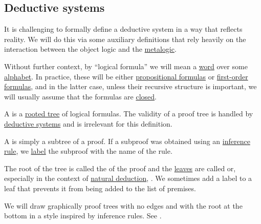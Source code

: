 \subsection{Deductive systems}\label{subsec:deductive_systems}

It is challenging to formally define a deductive system in a way that reflects reality. We will do this via some auxiliary definitions that rely heavily on the interaction between the object logic and the \hyperref[con:metalogic]{metalogic}.

Without further context, by \enquote{logical formula} we will mean a \hyperref[def:formal_language/word]{word} over some \hyperref[def:formal_language]{alphabet}. In practice, these will be either \hyperref[def:propositional_grammar_schema/formula]{propositional formulas} or \hyperref[def:first_order_syntax/formula]{first-order formulas}, and in the latter case, unless their recursive structure is important, we will usually assume that the formulas are \hyperref[def:first_order_syntax/closed_formula]{closed}.

\begin{definition}\label{def:proof_tree}\mimprovised
  A  is a \hyperref[def:rooted_tree]{rooted tree} of logical formulas. The validity of a proof tree is handled by \hyperref[def:deductive_system]{deductive systems} and is irrelevant for this definition.

  \begin{thmenum}
     A  is simply a subtree of a proof. If a subproof was obtained using an \hyperref[def:judgment/inference_rule]{inference rule}, we \hyperref[def:labeled_set]{label} the subproof with the name of the rule.

     The root of the tree is called the  of the proof and the \hyperref[def:rooted_tree/leaf]{leaves} are called  or, especially in the context of \hyperref[def:natural_deduction_system]{natural deduction}, . We sometimes add a  label to a leaf that prevents it from being added to the list of premises.

     We will draw graphically proof trees with no edges and with the root at the bottom in a style inspired by inference rules. See .
  \end{thmenum}
\end{definition}

